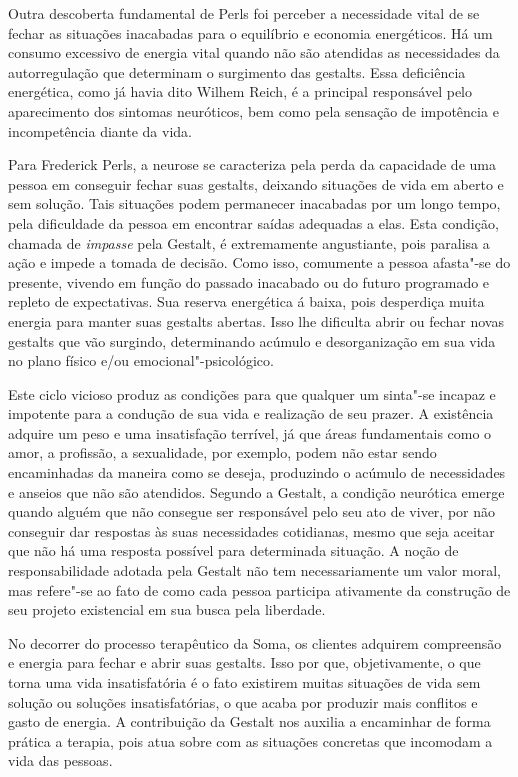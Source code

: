 Outra descoberta fundamental de Perls foi perceber a necessidade vital
de se fechar as situações inacabadas para o equilíbrio e economia
energéticos. Há um consumo excessivo de energia vital quando não são
atendidas as necessidades da autorregulação que determinam o surgimento
das gestalts. Essa deficiência energética, como já havia dito Wilhem
Reich, é a principal responsável pelo aparecimento dos sintomas
neuróticos, bem como pela sensação de impotência e incompetência diante
da vida.

Para Frederick Perls, a neurose se caracteriza pela perda da capacidade
de uma pessoa em conseguir fechar suas gestalts, deixando situações de
vida em aberto e sem solução. Tais situações podem permanecer inacabadas
por um longo tempo, pela dificuldade da pessoa em encontrar saídas
adequadas a elas. Esta condição, chamada de \emph{impasse} pela Gestalt,
é extremamente angustiante, pois paralisa a ação e impede a tomada de
decisão. Como isso, comumente a pessoa afasta"-se do presente, vivendo em
função do passado inacabado ou do futuro programado e repleto de
expectativas. Sua reserva energética á baixa, pois desperdiça muita
energia para manter suas gestalts abertas. Isso lhe dificulta abrir ou
fechar novas gestalts que vão surgindo, determinando acúmulo e
desorganização em sua vida no plano físico e/ou emocional"-psicológico.

Este ciclo vicioso produz as condições para que qualquer um sinta"-se
incapaz e impotente para a condução de sua vida e realização de seu
prazer. A existência adquire um peso e uma insatisfação terrível, já que
áreas fundamentais como o amor, a profissão, a sexualidade, por exemplo,
podem não estar sendo encaminhadas da maneira como se deseja, produzindo
o acúmulo de necessidades e anseios que não são atendidos. Segundo a
Gestalt, a condição neurótica emerge quando alguém que não consegue ser
responsável pelo seu ato de viver, por não conseguir dar respostas às
suas necessidades cotidianas, mesmo que seja aceitar que não há uma
resposta possível para determinada situação. A noção de responsabilidade
adotada pela Gestalt não tem necessariamente um valor moral, mas
refere"-se ao fato de como cada pessoa participa ativamente da construção
de seu projeto existencial em sua busca pela liberdade.

No decorrer do processo terapêutico da Soma, os clientes adquirem
compreensão e energia para fechar e abrir suas gestalts. Isso por que,
objetivamente, o que torna uma vida insatisfatória é o fato existirem
muitas situações de vida sem solução ou soluções insatisfatórias, o que
acaba por produzir mais conflitos e gasto de energia. A contribuição da
Gestalt nos auxilia a encaminhar de forma prática a terapia, pois atua
sobre com as situações concretas que incomodam a vida das pessoas.

